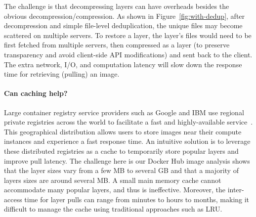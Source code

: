 The challenge is that decompressing layers can have overheads besides the obvious decompression/compression. As shown in Figure~\ref{fig:with-dedup}, 
after decompression and simple file-level deduplication, the unique files may become scattered on
multiple servers. 
To restore a layer,
the layer's files would need to be first fetched from multiple servers, then compressed as a layer (to preserve transparency and avoid client-side API modifications)
and sent back to the client.
The extra network, I/O, and computation latency will slow down the response time for retrieving (pulling) an image.


 

\paragraph{Can caching help?}
Large container registry service providers such as Google and IBM use regional private registries across the world to facilitate a fast and highly-available service~\cite{GoogleContainerRegistry,ibmregistry}.  
This geographical distribution allows users to store images near their compute instances and experience a fast response time. 
An intuitive solution is to 
leverage these distributed registries as a cache to temporarily store popular layers and
improve pull latency.
The challenge here is our Docker Hub image analysis shows that the layer sizes 
vary from a few MB to several GB and that a majority of layers sizes are around several MB. A small main memory cache cannot accommodate many popular layers, and thus is ineffective. Moreover, the inter-access time for layer pulls can range from minutes to hours to months, making it difficult to manage the cache using traditional approaches such as LRU.

